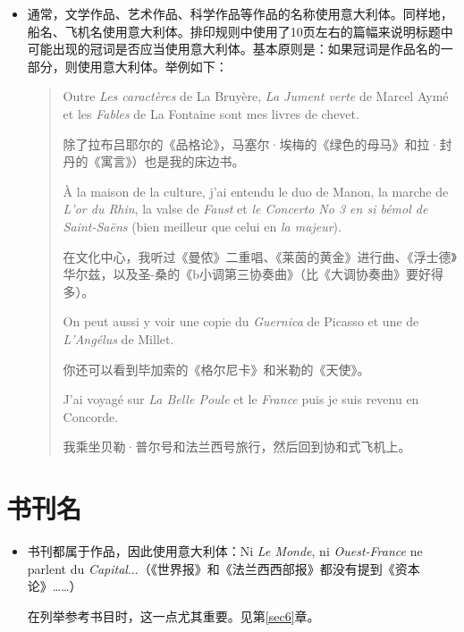 \begin{itemize}
    \item 通常，文学作品、艺术作品、科学作品等作品的名称使用意大利体。同样地，船名、飞机名使用意大利体。排印规则中使用了10页左右的篇幅来说明标题中可能出现的冠词是否应当使用意大利体。基本原则是：如果冠词是作品名的一部分，则使用意大利体。举例如下：
    
    \begin{quote}
        Outre \emph{Les caractères} de La Bruyère, \emph{La Jument verte} de Marcel Aymé et les \emph{Fables} de La Fontaine sont mes livres de chevet.

        \begin{bil}
            除了拉布吕耶尔的《品格论》，马塞尔·埃梅的《绿色的母马》和拉·封丹的《寓言》）也是我的床边书。
        \end{bil}

        À la maison de la culture, j'ai entendu le duo de Manon, la marche de \emph{L'or du Rhin}, la valse de \emph{Faust} et \emph{le Concerto No 3 en si bémol de Saint-Saëns} (bien meilleur que celui en \emph{la majeur}).

        \begin{bil}
            在文化中心，我听过《曼侬》二重唱、《莱茵的黄金》进行曲、《浮士德》华尔兹，以及圣-桑的《b小调第三协奏曲》（比《大调协奏曲》要好得多）。
        \end{bil}

        On peut aussi y voir une copie du \emph{Guernica} de Picasso et une de \emph{L'Angélus} de Millet.

        \begin{bil}
            你还可以看到毕加索的《格尔尼卡》和米勒的《天使》。
        \end{bil}

        J'ai voyagé sur \emph{La Belle Poule} et le \emph{France} puis je suis revenu en Concorde.

        \begin{bil}
            我乘坐贝勒·普尔号和法兰西号旅行，然后回到协和式飞机上。
        \end{bil}
    \end{quote}
\end{itemize}

\section{书刊名}

\begin{itemize}
    \item 书刊都属于作品，因此使用意大利体：Ni \emph{Le Monde}, ni \emph{Ouest-France }ne parlent du \emph{Capital}...（《世界报》和《法兰西西部报》都没有提到《资本论》……）
    
    在列举参考书目时，这一点尤其重要。见第\ref{sec6}章。
\end{itemize}

